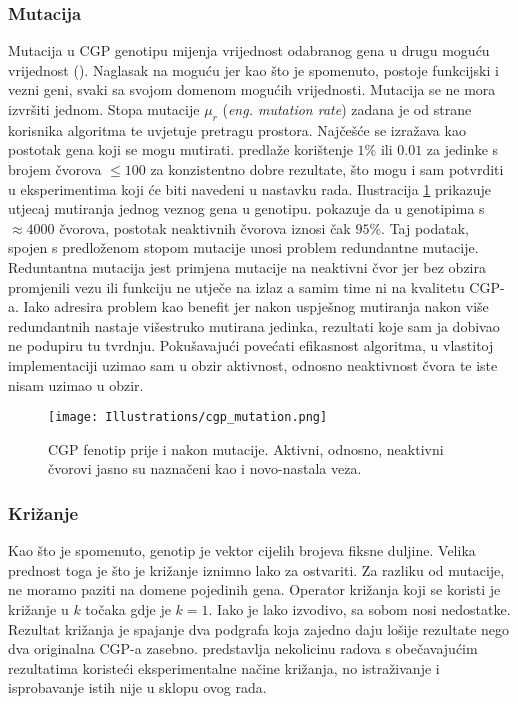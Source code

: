 \subsubsection{Mutacija}
Mutacija u CGP genotipu mijenja vrijednost odabranog gena u drugu moguću vrijednost (\cite{cgp}).
Naglasak na moguću jer kao što je spomenuto, postoje funkcijski i vezni geni, svaki sa svojom domenom mogućih vrijednosti.
Mutacija se ne mora izvršiti jednom.
Stopa mutacije $\mu_r$ (\emph{eng. mutation rate}) zadana je od strane korisnika algoritma te uvjetuje pretragu prostora.
Najčešće se izražava kao postotak gena koji se mogu mutirati.
\cite{cgp} predlaže korištenje $1\%$ ili $0.01$ za jedinke s brojem čvorova $\leq 100$ za konzistentno dobre rezultate, što mogu i sam potvrditi u eksperimentima koji će biti navedeni u nastavku rada.
Ilustracija \ref{fig:cgp_mutation} prikazuje utjecaj mutiranja jednog veznog gena u genotipu.
\cite{cgp_experiment} pokazuje da u genotipima s $\approx 4000$ čvorova, postotak neaktivnih čvorova iznosi čak $95\%$.
Taj podatak, spojen s predloženom stopom mutacije unosi problem redundantne mutacije.
Reduntantna mutacija jest primjena mutacije na neaktivni čvor jer bez obzira promjenili vezu ili funkciju ne utječe na izlaz a samim time ni na kvalitetu CGP-a.
Iako \cite{cgp} adresira problem kao benefit jer nakon uspješnog mutiranja nakon više redundantnih nastaje višestruko mutirana jedinka, rezultati koje sam ja dobivao ne podupiru tu tvrdnju.
Pokušavajući povećati efikasnost algoritma, u vlastitoj implementaciji uzimao sam u obzir aktivnost, odnosno neaktivnost čvora te iste nisam uzimao u obzir.

\begin{figure}
	\centering
	\texttt{[image: Illustrations/cgp\_mutation.png]}
	\caption{CGP fenotip prije i nakon mutacije. Aktivni, odnosno, neaktivni čvorovi jasno su naznačeni kao i novo-nastala veza.}
	\label{fig:cgp_mutation}
\end{figure}

\subsubsection{Križanje}
Kao što je spomenuto, genotip je vektor cijelih brojeva fiksne duljine.
Velika prednost toga je što je križanje iznimno lako za ostvariti.
Za razliku od mutacije, ne moramo paziti na domene pojedinih gena.
Operator križanja koji se koristi je križanje u $k$ točaka gdje je $k = 1$.
Iako je lako izvodivo, sa sobom nosi nedostatke.
Rezultat križanja je spajanje dva podgrafa koja zajedno daju lošije rezultate nego dva originalna CGP-a zasebno.
\cite{cgp_experiment} predstavlja nekolicinu radova s obečavajućim rezultatima koristeći eksperimentalne načine križanja, no istraživanje i isprobavanje istih nije u sklopu ovog rada.

